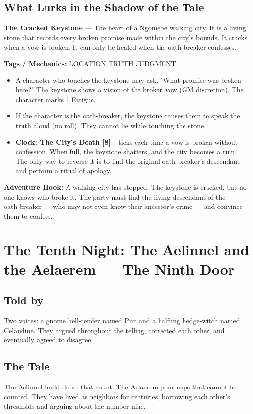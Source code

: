 \documentclass[10pt,twoside]{book}
\newcommand{\tag}[1]{\textsc{#1}}
\begin{document}
\section*{What Lurks in the Shadow of the Tale}
\begin{infobox}
\textbf{The Cracked Keystone} --- The heart of a Ngomebe walking city. It is a living stone that records every broken promise made within the city's bounds. It cracks when a vow is broken. It can only be healed when the oath‑breaker confesses.

\textbf{Tags / Mechanics:} \tag{LOCATION} \tag{TRUTH} \tag{JUDGMENT}

\begin{itemize}
\item A character who touches the keystone may ask, "What promise was broken here?" The keystone shows a vision of the broken vow (GM discretion). The character marks 1 Fatigue.
\item If the character is the oath‑breaker, the keystone causes them to speak the truth aloud (no roll). They cannot lie while touching the stone.
\item \textbf{Clock: The City's Death [8]} -- ticks each time a vow is broken without confession. When full, the keystone shatters, and the city becomes a ruin. The only way to reverse it is to find the original oath‑breaker's descendant and perform a ritual of apology.
\end{itemize}

\textbf{Adventure Hook:} A walking city has stopped. The keystone is cracked, but no one knows who broke it. The party must find the living descendant of the oath‑breaker --- who may not even know their ancestor's crime --- and convince them to confess.
\end{infobox}

\chapter{The Tenth Night: The Aelinnel and the Aelaerem --- The Ninth Door}

\section*{Told by}
Two voices: a gnome bell‑tender named Pim and a halfling hedge‑witch named Celandine. They argued throughout the telling, corrected each other, and eventually agreed to disagree.

\section*{The Tale}
The Aelinnel build doors that count. The Aelaerem pour cups that cannot be counted. They have lived as neighbors for centuries, borrowing each other's thresholds and arguing about the number nine.
\end{document}
